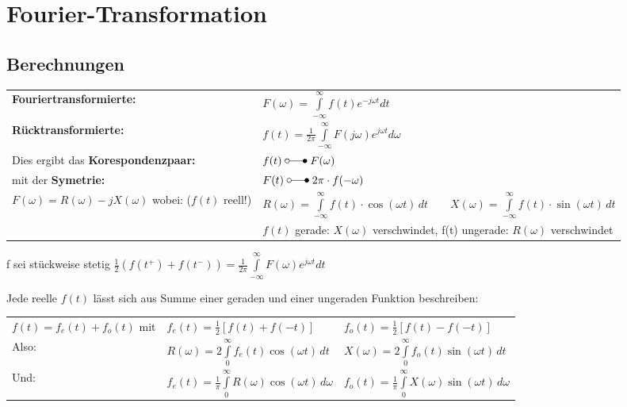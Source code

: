 \section{Fourier-Transformation}
	\subsection{Berechnungen}%
		\begin{tabular}{|p{6cm} l|} \hline
			\textbf{Fouriertransformierte:} &
			$F(\omega) = \int\limits_{-\infty}^{\infty} f(t)e^{-j\omega t}dt$ \\
			\textbf{Rücktransformierte:} &
			$f(t) = \frac{1}{2\pi}\int\limits_{-\infty}^{\infty}F(j\omega)e^{j\omega t}d\omega$ \\ \hline
		
		Dies ergibt das \textbf{Korespondenzpaar:} & $f(t) \; \laplace \; F(\omega)$ \\
		mit der \textbf{Symetrie:} & $F(t) \; \laplace \; 2\pi \cdot f(-\omega)$ \\
		
		$F(\omega) = R(\omega) -jX(\omega)$ wobei: ($f(t)$ reell!) &
		$R(\omega) = \int\limits_{-\infty}^\infty f(t)\cdot \cos(\omega t)\,dt \quad\quad X(\omega) =
		\int\limits_{-\infty}^\infty f(t)\cdot \sin(\omega t)\,dt$
		\\
		&$f(t)$ gerade: $X(\omega)$ verschwindet, f(t) ungerade: $R(\omega)$ verschwindet \\
		\hline
		\end{tabular}
		
		f sei stückweise stetig $\frac{1}{2}(f(t^+) + f(t^-)) = \frac{1}{2\pi} \int\limits_{-\infty}^{\infty}F(\omega)e^{j\omega t} dt$
		
		Jede reelle $f(t)$ lässt sich aus Summe einer geraden und einer ungeraden Funktion beschreiben:\\
		\begin{tabular}{lll}
		$f(t) = f_e(t) + f_o(t)$ mit & $f_e(t) = \frac{1}{2}[f(t) + f(-t)]$ & $f_o(t) = \frac{1}{2}[f(t) - f(-t)]$ \\
		
		Also: & $R(\omega) = 2 \int\limits_0^\infty f_e(t) \cos(\omega t)\,dt$ & $X(\omega) = 2 \int\limits_0^\infty
		f_o(t) \sin(\omega t)\,dt$ \\
		
		Und: & $f_e(t) = \frac{1}{\pi}\int\limits_0^\infty R(\omega)\cos(\omega t)\,d\omega$ & 
		$f_o(t) = \frac{1}{\pi}\int\limits_0^\infty X(\omega)\sin(\omega t)\,d\omega$ \\
		\end{tabular}
		

